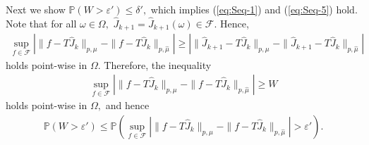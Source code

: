 \documentclass[12pt,technote,onecolumn]{IEEEtran}
\begin{document}
\begin{IEEEproof}
	Next we show $\mathbb{P}\left(W>\varepsilon'\right)\leq\delta',$
	which implies (\ref{eq:Seq-1}) and (\ref{eq:Seq-5}) hold. Note that
	for all $\omega\in\Omega,$ $\widehat{J}_{k+1}=\widehat{J}_{k+1}\left(\omega\right)\in\mathcal{F}.$
	Hence, 
	\begin{equation*}
	\begin{aligned}
	\sup_{f\in\mathcal{F}}\left|\|f-T\widehat{J}_{k}\|_{p,\mu}-\|f-T\widehat{J}_{k}\|_{p,\hat{\mu}}\right|
	\geq\left|\|\widehat{J}_{k+1}-T\widehat{J}_{k}\|_{p,\mu}-\|\widehat{J}_{k+1}-T\widehat{J}_{k}\|_{p,\hat{\mu}}\right|
	\end{aligned}
	\end{equation*}
	holds point-wise in $\Omega.$ Therefore, the inequality
	\begin{equation*}
	\begin{aligned}
	\sup_{f\in\mathcal{F}}\left|\|f-T\widehat{J}_{k}\|_{p,\mu}-\|f-T\widehat{J}_{k}\|_{p,\hat{\mu}}\right|\geq W
	\end{aligned}
	\end{equation*}
	holds point-wise in $\Omega,$ and hence
	\begin{equation*}
	\begin{aligned}
	\mathbb{P}\left(W>\varepsilon'\right)
	\leq\mathbb{P}\left(\sup_{f\in\mathcal{F}}\left|\|f-T\widehat{J}_{k}\|_{p,\mu}-\|f-T\widehat{J}_{k}\|_{p,\hat{\mu}}\right|>\varepsilon'\right).
	\end{aligned}
	\end{equation*}
	

\end{IEEEproof}
\end{document}
